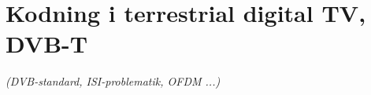 \newpage
\section{Kodning i terrestrial digital TV, DVB-T}
\textit{(DVB-standard, ISI-problematik, OFDM ...)}
